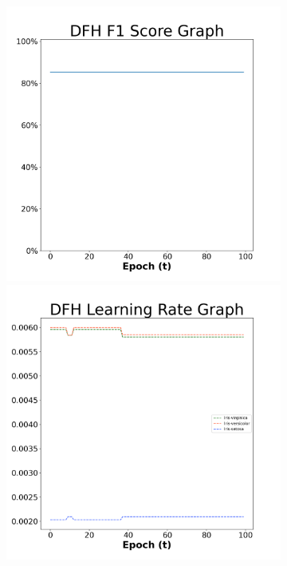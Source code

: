 \begin{figure}[H]
    \centering %
\begin{subfigure}{0.3\textwidth}
  \includegraphics[width=\linewidth]{images/exper2/iris/DFH_0.01_f1.png}
    \includegraphics[width=\linewidth]{images/exper2/iris/DFH_0.01_lr.png}

\end{subfigure}
\end{figure}
